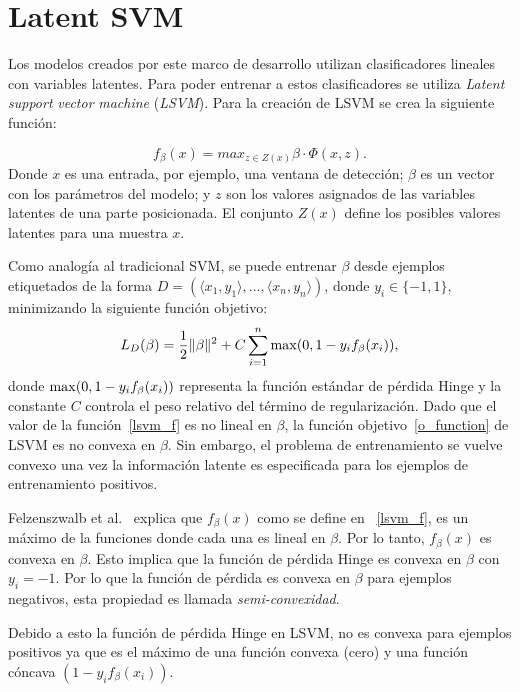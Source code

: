 \section{Latent SVM}\label{sec:lsvmIV}
Los modelos creados por este marco de desarrollo utilizan clasificadores lineales con variables latentes. Para poder entrenar a estos clasificadores se utiliza \textit{Latent} \textit{support} \textit{vector} \textit{machine} (\textit{LSVM}). Para la creación de LSVM se crea la siguiente función:

\begin{equation}\label{lsvm_f}
f_{\beta}(x) = max_{z \in Z(x)} \beta \cdot \Phi (x, z).
\end{equation}
Donde $x$ es una entrada, por ejemplo, una ventana de detección; $\beta$ es un vector con los parámetros del modelo; y $z$ son los valores asignados de las variables latentes de una parte posicionada. El conjunto $Z(x)$ define los posibles valores latentes para una muestra $x$.

Como analogía al tradicional SVM, se puede entrenar $\beta$ desde ejemplos etiquetados de la forma $D = (\langle x_1, y_1 \rangle, \dots, \langle x_n, y_n \rangle)$, donde $y_i \in \{-1, 1\}$, minimizando la siguiente función objetivo:
\begin{equation}\label{o_function}
L_D(\beta) = \frac{1}{2} \Vert \beta \Vert^2 + C \sum_{i=1}^n {\rm max} (0, 1-y_if_\beta (x_i)),
\end{equation}
donde ${\rm max} (0, 1-y_if_\beta(x_i))$ representa la función estándar de pérdida Hinge y la constante $C$ controla el peso relativo del término de regularización. Dado que el valor de la función~\ref{lsvm_f} es no lineal en $\beta$, la función objetivo~\ref{o_function} de LSVM es no convexa en $\beta$. Sin embargo, el problema de entrenamiento se vuelve convexo una vez la información latente es especificada para los ejemplos de entrenamiento positivos.

Felzenszwalb et al.~\cite{Felzenszwalb2010} explica que $f_{\beta}(x)$ como se define en ~\ref{lsvm_f}, es un máximo de la funciones donde cada una es lineal en $\beta$. Por lo tanto, $f_{\beta}(x)$ es convexa en $\beta$. Esto implica que la función de pérdida Hinge es convexa en $\beta$ con $y_i = -1$. Por lo que la función de pérdida es convexa en $\beta$ para ejemplos negativos, esta propiedad es llamada \textit{semi-convexidad}.

Debido a esto la función de pérdida Hinge en LSVM, no es convexa para ejemplos positivos ya que es el máximo de una función convexa (cero) y una función cóncava $(1-y_if_{\beta}(x_i))$.

